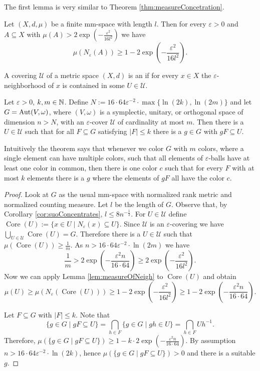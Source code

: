 The first lemma is very similar to Theorem \ref{thm:measureConcetration}.
\begin{lemma}\label{lem:measureOfNeigh}
Let $(X,d,\mu)$ be a finite mm-space with length $l$. Then for every $\varepsilon>0$ and $A\subseteq X$ with $\mu(A)>2\exp\left(-\frac{\varepsilon^2}{16l^2}\right)$ we have
\[\mu(N_\varepsilon(A))\geq 1-2\exp\left(-\frac{\varepsilon^2}{16l^2}\right).\]
\end{lemma}


A covering $\mathcal{U}$ of a metric space $(X,d)$ is an  if for every $x\in X$ the $\varepsilon$-neighborhood of $x$ is contained in some $U\in\mathcal{U}$.

\begin{theorem}
Let $\varepsilon>0$, $k,m\in\mathbb{N}$. Define $N:=16\cdot64\varepsilon^{-2}\cdot\max\{\ln(2k),\ln(2m)\}$ and let $G=\operatorname{Aut}(V,\omega)$, where $(V,\omega)$ is a symplectic, unitary, or orthogonal space of dimension $n>N$, with an $\varepsilon$-cover $\mathcal{U}$ of cardinality at most $m$. Then there is a $U\in\mathcal{U}$ such that for all $F\subseteq G$ satisfying $|F|\leq k$ there is a $g\in G$ with $gF\subseteq U$.
\end{theorem}
Intuitively the theorem says that whenever we color $G$ with $m$ colors, where a single element can have multiple colors, such that all elements of $\varepsilon$-balls have at least one color in common, then there is one color $c$ such that for every $F$ with at most $k$ elements there is a $g$ where the elements of $gF$ all have the color $c$.
\begin{proof}
\def\core{\operatorname{Core}}
Look at $G$ as the usual mm-space with normalized rank metric and normalized counting measure.
Let $l$ be the length of $G$. Observe that, by Corollary \ref{cor:suoConcentrates}, $l\leq 8n^{-\frac{1}{2}}$.
For $U\in \mathcal{U}$ define $\core(U):=\{x\in U\mid N_\varepsilon(x)\subseteq U\}$. Since $\mathcal{U}$ is an $\varepsilon$-covering we have $\bigcup_{U\in\mathcal{U}}\core(U)=G$. Therefore there is a $U\in\mathcal{U}$ such that $\mu(\core(U))\geq\frac{1}{m}$. As $n>16\cdot64\varepsilon^{-2}\cdot\ln(2m)$ we have
\[\frac{1}{m}>2\exp\left(-\frac{\varepsilon^2n}{16\cdot64}\right)\geq 2\exp\left(-\frac{\varepsilon^2}{ 16l^2}\right).\]
Now we can apply Lemma \ref{lem:measureOfNeigh} to $\core(U)$ and obtain
\[\mu(U)\geq\mu(N_\varepsilon(\core(U)))\geq 1-2\exp\left(-\frac{\varepsilon^2}{ 16l^2}\right)\geq1-2\exp\left(-\frac{\varepsilon^2n}{16\cdot64}\right). \]

Let $F\subseteq G$ with $|F|\leq k$. Note that 
\[\{g\in G\mid gF\subseteq U\}=\bigcap_{h\in F}\{g\in G\mid gh\in U\}=\bigcap_{h\in F}Uh^{-1}.\]
Therefore, $\mu(\{g\in G\mid gF\subseteq U\})\geq 1-k\cdot2\exp\left(-\frac{\varepsilon^2n}{16\cdot64}\right)$. By assumption $n>16\cdot64\varepsilon^{-2}\cdot\ln(2k)$, hence $\mu(\{g\in G\mid gF\subseteq U\})>0$ and there is a suitable $g$. 
\end{proof}


